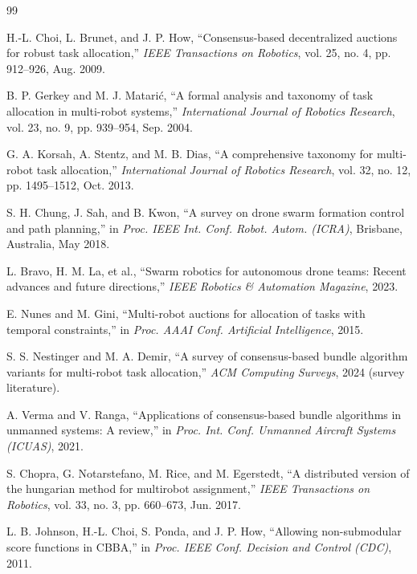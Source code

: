 \begin{thebibliography}{99}

H.-L. Choi, L. Brunet, and J. P. How,
``Consensus-based decentralized auctions for robust task allocation,''
\emph{IEEE Transactions on Robotics}, vol. 25, no. 4, pp. 912--926, Aug. 2009.

B. P. Gerkey and M. J. Matari\'c,
``A formal analysis and taxonomy of task allocation in multi-robot systems,''
\emph{International Journal of Robotics Research}, vol. 23, no. 9, pp. 939--954, Sep. 2004.

G. A. Korsah, A. Stentz, and M. B. Dias,
``A comprehensive taxonomy for multi-robot task allocation,''
\emph{International Journal of Robotics Research}, vol. 32, no. 12, pp. 1495--1512, Oct. 2013.

S. H. Chung, J. Sah, and B. Kwon,
``A survey on drone swarm formation control and path planning,''
in \emph{Proc. IEEE Int. Conf. Robot. Autom. (ICRA)}, Brisbane, Australia, May 2018.

L. Bravo, H. M. La, et al.,
``Swarm robotics for autonomous drone teams: Recent advances and future directions,''
\emph{IEEE Robotics \& Automation Magazine}, 2023.

E. Nunes and M. Gini,
``Multi-robot auctions for allocation of tasks with temporal constraints,''
in \emph{Proc. AAAI Conf. Artificial Intelligence}, 2015.

S. S. Nestinger and M. A. Demir,
``A survey of consensus-based bundle algorithm variants for multi-robot task allocation,''
\emph{ACM Computing Surveys}, 2024 (survey literature).

A. Verma and V. Ranga,
``Applications of consensus-based bundle algorithms in unmanned systems: A review,''
in \emph{Proc. Int. Conf. Unmanned Aircraft Systems (ICUAS)}, 2021.

S. Chopra, G. Notarstefano, M. Rice, and M. Egerstedt,
``A distributed version of the hungarian method for multirobot assignment,''
\emph{IEEE Transactions on Robotics}, vol. 33, no. 3, pp. 660--673, Jun. 2017.

L. B. Johnson, H.-L. Choi, S. Ponda, and J. P. How,
``Allowing non-submodular score functions in CBBA,''
in \emph{Proc. IEEE Conf. Decision and Control (CDC)}, 2011.


\end{thebibliography}
